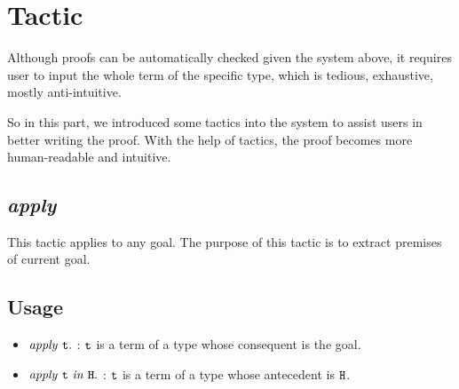 \section{Tactic}
Although proofs can be automatically checked given the system above, it requires user to input the whole
term of the specific type, which is tedious, exhaustive, mostly anti-intuitive.\par
So in this part, we introduced some tactics into the system 
to assist users in better writing the proof. With the help of
tactics, the proof becomes more human-readable and intuitive.\par

\subsection{\it apply}
This tactic applies to any goal. The purpose of this tactic is to extract premises of
current goal.

\subsection*{Usage}
\begin{itemize}
\item $\it apply\ \tt t.$ : $\tt t$ is a term of a type whose consequent is the goal.
\item $\it apply\ \tt t\ \it in\ \tt H.$ : $\tt t$ is a term of a type whose antecedent is $\tt H$.
\end{itemize}

